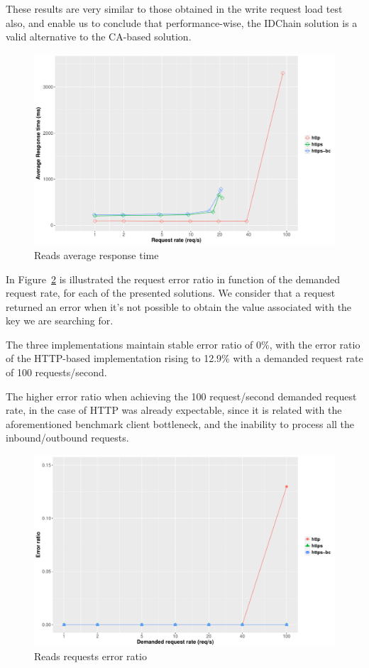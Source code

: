 These results are very similar to those obtained in the write request load test also, and enable us to conclude that performance-wise, the IDChain solution is a valid alternative to the CA-based solution.

\begin{figure}[htb]
  \centering
  \includegraphics[scale=0.4]{Figures/evaluation/average-response-time-reads-new.pdf}
  \caption{Reads average response time}
  \label{fig:average-response-time-reads}
\end{figure}

In Figure~\ref{fig:error-ratio-reads} is illustrated the request error ratio in function of the demanded request rate, for each of the presented solutions.
We consider that a request returned an error when it's not possible to obtain the value associated with the key we are searching for.

The three implementations maintain stable error ratio of 0\%, with the error ratio of the HTTP-based implementation rising to 12.9\% with a demanded request rate of 100 requests/second.

The higher error ratio when achieving the 100 request/second demanded request rate, in the case of HTTP was already expectable, since it is related with the aforementioned benchmark client bottleneck, and the inability to process all the inbound/outbound requests.

\begin{figure}[htb]
  \centering
  \includegraphics[scale=0.4]{Figures/evaluation/error-ratio-reads-new.pdf}
  \caption{Reads requests error ratio}
  \label{fig:error-ratio-reads}
\end{figure}

